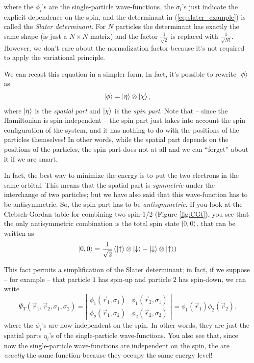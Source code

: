 \documentclass[a4paper,twoside,11pt]{book}
\begin{document}
where the $\phi_i$'s are the single-particle wave-functions, the $\sigma_i$'s just indicate the explicit dependence on the spin, and the determinant in (\ref{eq:slater_example}) is called the \emph{Slater determinant}. For $N$ particles the determinant has exactly the same shape (is just a $N \times N$ matrix) and the factor $\frac{1}{\sqrt{2}}$ is replaced with $\frac{1}{\sqrt{N!}}$. However, we don't care about the normalization factor because it's not required to apply the variational principle.

We can recast this equation in a simpler form. In fact, it's possible to rewrite $\Ket{\phi}$ as
\begin{equation}
	\Ket{\phi} = \Ket{\eta} \otimes \Ket{\chi},
\end{equation}
where $\Ket{\eta}$ is the \emph{spatial part} and $\Ket{\chi}$ is the \emph{spin part}. Note that -- since the Hamiltonian is spin-independent -- the spin part just takes into account the spin configuration of the system, and it has nothing to do with the positions of the particles themselves! In other words, while the spatial part depends on the positions of the particles, the spin part does not at all and we can ``forget'' about it if we are smart. 

In fact, the best way to minimize the energy is to put the two electrons in the same orbital. This means that the spatial part is \emph{symmetric} under the interchange of two particles; but we have also said that this wave-function has to be antisymmetric. So, the spin part has to be \emph{antisymmetric}. If you look at the Clebsch-Gordan table for combining two spin-1/2 (Figure \ref{fig:CGt}), you see that the only antisymmetric combination is the total spin state $\Ket{0,0}$, that can be written as
\begin{equation}
	\Ket{0,0} 
	= \frac{1}{\sqrt{2}}
	 \left( \Ket{\uparrow} \otimes \Ket{\downarrow} 
	- \Ket{\downarrow} \otimes \Ket{\uparrow} \right)
	\label{eq:total_spin}
\end{equation}

This fact permits a simplification of the Slater determinant; in fact, if we suppose -- for example --  that particle $1$ has spin-up and particle $2$ has spin-down, we can write
\begin{equation}
	\Psi_T(\vec{r}_1,\vec{r}_2,\sigma_1,\sigma_2) 
	=\left\lvert
	\begin{array}{cc}
		\phi_1(\vec{r}_1,\sigma_1) & \phi_1(\vec{r}_2,\sigma_1) \\
		\phi_2(\vec{r}_1,\sigma_2) & \phi_2(\vec{r}_2,\sigma_2)
	\end{array}
	\right\lvert
	= \phi_1(\vec{r}_1)\phi_2(\vec{r}_2).
\end{equation}
where the $\phi_i$'s are now independent on the spin. In other words, they are just the spatial parts $\eta_i$'s of the single-particle wave-functions. You also see that, since now the single-particle wave-functions are independent on the spin, the are \emph{exactly} the same function because they occupy the same energy level!
\end{document}
